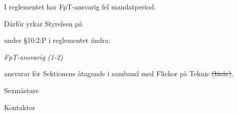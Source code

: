 \documentclass[../_main/handlingar.tex]{subfiles}
\begin{document}
I reglementet har FpT-ansvarig fel mandatperiod.

Därför yrkar Styrelsen på
\begin{attsatser}
    \att under \S10:2:P i reglementet ändra:\par
    {\it
    FpT-ansvarig (1-2)
    \begin{itemizedash}
        \item ansvarar för Sektionens åtagande i samband med Flickor på Teknis \sout{(läsår)}.
    \end{itemizedash}
    }
\end{attsatser}

\begin{signatures}{2}
    \ist
    \signature{Martin Gemborn Nilsson}{Sexmästare}
    \signature{Erik Månsson}{Kontaktor}
\end{signatures}
\end{document}
